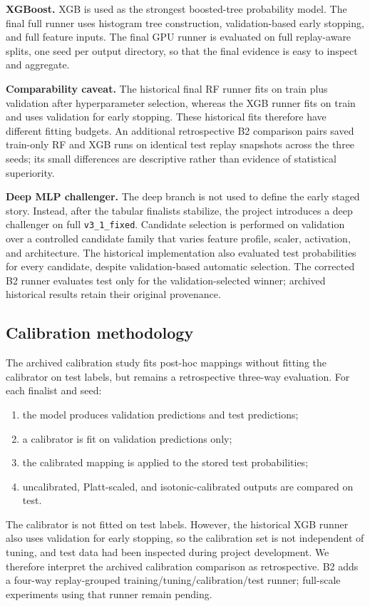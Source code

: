 \documentclass[11pt,a4paper]{article}
\begin{document}
\textbf{XGBoost.} XGB is used as the strongest boosted-tree probability model. The final full runner uses histogram tree construction, validation-based early stopping, and full feature inputs. The final GPU runner is evaluated on full replay-aware splits, one seed per output directory, so that the final evidence is easy to inspect and aggregate.

\textbf{Comparability caveat.} The historical final RF runner fits on train plus validation after hyperparameter selection, whereas the XGB runner fits on train and uses validation for early stopping. These historical fits therefore have different fitting budgets. An additional retrospective B2 comparison pairs saved train-only RF and XGB runs on identical test replay snapshots across the three seeds; its small differences are descriptive rather than evidence of statistical superiority.

\textbf{Deep MLP challenger.} The deep branch is not used to define the early staged story. Instead, after the tabular finalists stabilize, the project introduces a deep challenger on full \texttt{v3\_1\_fixed}. Candidate selection is performed on validation over a controlled candidate family that varies feature profile, scaler, activation, and architecture. The historical implementation also evaluated test probabilities for every candidate, despite validation-based automatic selection. The corrected B2 runner evaluates test only for the validation-selected winner; archived historical results retain their original provenance.

\subsection{Calibration methodology}
The archived calibration study fits post-hoc mappings without fitting the calibrator on test labels, but remains a retrospective three-way evaluation. For each finalist and seed:
\begin{enumerate}
    \item the model produces validation predictions and test predictions;
    \item a calibrator is fit on validation predictions only;
    \item the calibrated mapping is applied to the stored test probabilities;
    \item uncalibrated, Platt-scaled, and isotonic-calibrated outputs are compared on test.
\end{enumerate}

The calibrator is not fitted on test labels. However, the historical XGB runner also uses validation for early stopping, so the calibration set is not independent of tuning, and test data had been inspected during project development. We therefore interpret the archived calibration comparison as retrospective. B2 adds a four-way replay-grouped training/tuning/calibration/test runner; full-scale experiments using that runner remain pending.
\end{document}

